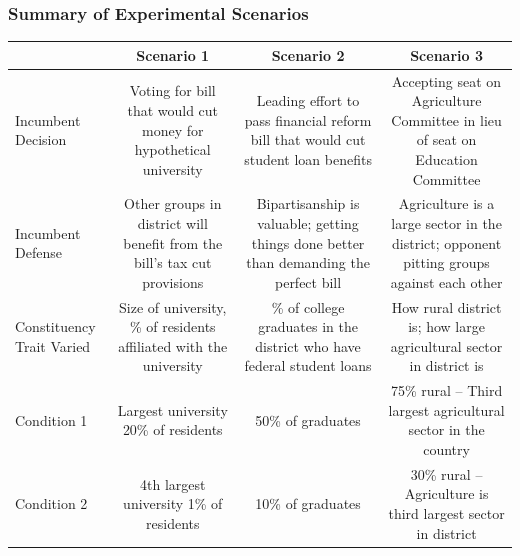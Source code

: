 \documentclass[14pt]{beamer}
\newcommand\tb{\textbf}
\begin{document}
\begin{frame}
\frametitle{Summary of Experimental Scenarios}
\tiny
\begin{table}
	\centering
	\def\arraystretch{1.5}
	\begin{tabulary}{\linewidth}{lCCC}
	\\
	\hline
	&\tb{Scenario 1}&\tb{Scenario 2}&\tb{Scenario 3}\\
	\hline
	Incumbent Decision&Voting for bill that would cut money for hypothetical university&Leading effort to pass financial reform bill that would cut student loan benefits&Accepting seat on Agriculture Committee in lieu of seat on Education Committee\\
	\hline
	Incumbent Defense&Other groups in district will benefit from the bill’s tax cut provisions&Bipartisanship is valuable; getting things done better than demanding the perfect bill&Agriculture is a large sector in the district; opponent pitting groups against each other\\
	\hline
	Constituency Trait Varied&Size of university, 
	\% of residents affiliated with the university&\% of college graduates in the district who have federal student loans&How rural district is; how large agricultural sector in district is\\
	\hline
	Condition 1&Largest university
	20\% of residents&50\% of graduates&75\% rural --
	Third largest agricultural sector in the country
\\
	\hline
	Condition 2&4th largest university
	1\% of residents&10\% of graduates&30\% rural
-- Agriculture is third largest sector in district
\\
	\hline
	\end{tabulary}
\end{table}
\end{frame}
\end{document}
